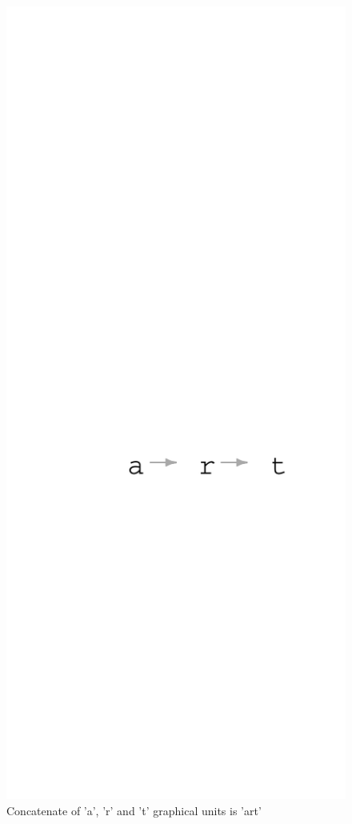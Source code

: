 \documentclass[article]{jss}\usepackage{knitr}
\begin{document}
\begin{figure}[H]

{\centering \includegraphics[width=\maxwidth]{figure/a_r_t-1} 

}

\caption{\label{fig:figs}Concatenate of 'a', 'r' and 't' graphical units is 'art'}\label{fig:a_r_t}
\end{figure}
\end{document}
